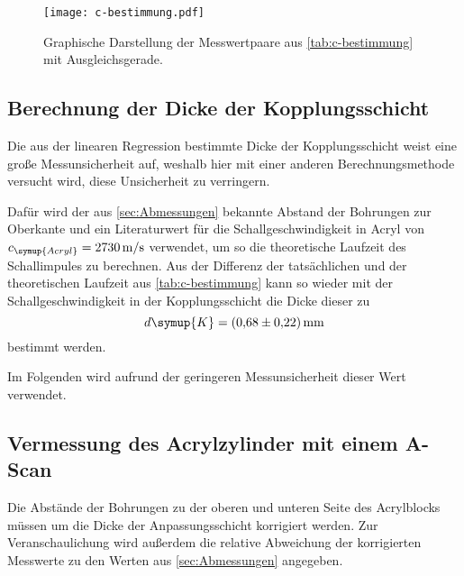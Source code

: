 \begin{figure}[H]
    \centering
    \texttt{[image: c-bestimmung.pdf]}
    \caption{Graphische Darstellung der Messwertpaare aus \autoref{tab:c-bestimmung} mit Ausgleichsgerade.}
    \label{fig:c-bestimmung}
  \end{figure}

\subsection{Berechnung der Dicke der Kopplungsschicht}
Die aus der linearen Regression bestimmte Dicke der Kopplungsschicht weist eine große Messunsicherheit auf, weshalb hier mit einer anderen
Berechnungsmethode versucht wird, diese Unsicherheit zu verringern.

Dafür wird der aus \ref{sec:Abmessungen} bekannte Abstand der Bohrungen zur Oberkante und ein Literaturwert für die Schallgeschwindigkeit
in Acryl von $c_{\symup{Acryl}} = \qty{2730}{\metre\per\second}$ \cite{c_Acryl} verwendet, um so die theoretische Laufzeit des Schallimpules 
zu berechnen. Aus der Differenz der tatsächlichen und der theoretischen Laufzeit aus \autoref{tab:c-bestimmung} kann so wieder mit der 
Schallgeschwindigkeit in der Kopplungsschicht die Dicke dieser zu
\begin{equation*}
    d{\symup{K}} = \qty{0.68+-0.22}{\milli\metre}
\end{equation*}
bestimmt werden.

Im Folgenden wird aufrund der geringeren Messunsicherheit dieser Wert verwendet.

\subsection{Vermessung des Acrylzylinder mit einem A-Scan}
Die Abstände der Bohrungen zu der oberen und unteren Seite des Acrylblocks müssen um die Dicke der Anpassungsschicht korrigiert werden. 
Zur Veranschaulichung wird außerdem die relative Abweichung der korrigierten Messwerte zu den Werten aus \ref{sec:Abmessungen} angegeben.

